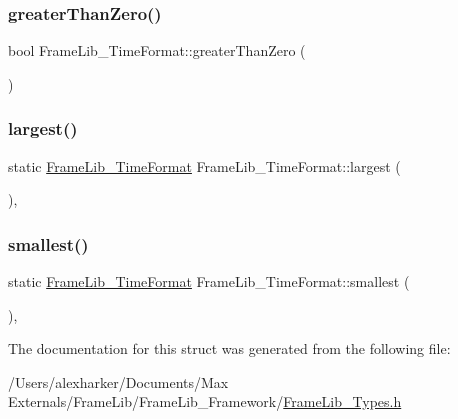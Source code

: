 \subsubsection{\texorpdfstring{greater\+Than\+Zero()}{greaterThanZero()}}
{\footnotesize\ttfamily bool Frame\+Lib\+\_\+\+Time\+Format\+::greater\+Than\+Zero (\begin{DoxyParamCaption}{ }\end{DoxyParamCaption})\hspace{0.3cm}{\ttfamily [inline]}}

\mbox{\label{struct_frame_lib___time_format_a2f65fc07a71d9a8b4b14197cbe0d2e80}} 
\subsubsection{\texorpdfstring{largest()}{largest()}}
{\footnotesize\ttfamily static \hyperlink{struct_frame_lib___time_format}{Frame\+Lib\+\_\+\+Time\+Format} Frame\+Lib\+\_\+\+Time\+Format\+::largest (\begin{DoxyParamCaption}{ }\end{DoxyParamCaption})\hspace{0.3cm}{\ttfamily [inline]}, {\ttfamily [static]}}

\mbox{\label{struct_frame_lib___time_format_af4a3f4f806589e9f2bffbca7e9c6acba}} 
\subsubsection{\texorpdfstring{smallest()}{smallest()}}
{\footnotesize\ttfamily static \hyperlink{struct_frame_lib___time_format}{Frame\+Lib\+\_\+\+Time\+Format} Frame\+Lib\+\_\+\+Time\+Format\+::smallest (\begin{DoxyParamCaption}{ }\end{DoxyParamCaption})\hspace{0.3cm}{\ttfamily [inline]}, {\ttfamily [static]}}



The documentation for this struct was generated from the following file\+:\begin{DoxyCompactItemize}
\item 
/\+Users/alexharker/\+Documents/\+Max Externals/\+Frame\+Lib/\+Frame\+Lib\+\_\+\+Framework/\hyperlink{_frame_lib___types_8h}{Frame\+Lib\+\_\+\+Types.\+h}\end{DoxyCompactItemize}
